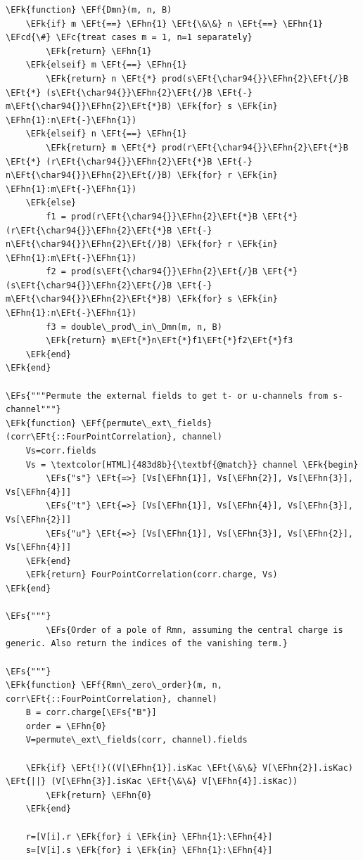 \documentclass[a4paper]{article}
\numberwithin{equation}{section}
\newcommand{\EFc}[1]{\textcolor{EFc}{#1}} %
\newcommand{\EFcd}[1]{\textcolor{EFcd}{#1}} %
\newcommand{\EFs}[1]{\textcolor{EFs}{#1}} %
\newcommand{\EFk}[1]{\textcolor{EFk}{#1}} %
\newcommand{\EFf}[1]{\textcolor{EFf}{#1}} %
\newcommand{\EFt}[1]{\textcolor{EFt}{#1}} %
\newcommand{\EFhn}[1]{\textcolor{EFhn}{#1}} %
\begin{document}
\begin{itemize}
\begin{Code}
\begin{Verbatim}
\EFk{function} \EFf{Dmn}(m, n, B)
    \EFk{if} m \EFt{==} \EFhn{1} \EFt{\&\&} n \EFt{==} \EFhn{1} \EFcd{\#} \EFc{treat cases m = 1, n=1 separately}
        \EFk{return} \EFhn{1}
    \EFk{elseif} m \EFt{==} \EFhn{1}
        \EFk{return} n \EFt{*} prod(s\EFt{\char94{}}\EFhn{2}\EFt{/}B \EFt{*} (s\EFt{\char94{}}\EFhn{2}\EFt{/}B \EFt{-} m\EFt{\char94{}}\EFhn{2}\EFt{*}B) \EFk{for} s \EFk{in} \EFhn{1}:n\EFt{-}\EFhn{1})
    \EFk{elseif} n \EFt{==} \EFhn{1}
        \EFk{return} m \EFt{*} prod(r\EFt{\char94{}}\EFhn{2}\EFt{*}B \EFt{*} (r\EFt{\char94{}}\EFhn{2}\EFt{*}B \EFt{-} n\EFt{\char94{}}\EFhn{2}\EFt{/}B) \EFk{for} r \EFk{in} \EFhn{1}:m\EFt{-}\EFhn{1})
    \EFk{else}
        f1 = prod(r\EFt{\char94{}}\EFhn{2}\EFt{*}B \EFt{*} (r\EFt{\char94{}}\EFhn{2}\EFt{*}B \EFt{-} n\EFt{\char94{}}\EFhn{2}\EFt{/}B) \EFk{for} r \EFk{in} \EFhn{1}:m\EFt{-}\EFhn{1})
        f2 = prod(s\EFt{\char94{}}\EFhn{2}\EFt{/}B \EFt{*} (s\EFt{\char94{}}\EFhn{2}\EFt{/}B \EFt{-} m\EFt{\char94{}}\EFhn{2}\EFt{*}B) \EFk{for} s \EFk{in} \EFhn{1}:n\EFt{-}\EFhn{1})
        f3 = double\_prod\_in\_Dmn(m, n, B)
        \EFk{return} m\EFt{*}n\EFt{*}f1\EFt{*}f2\EFt{*}f3
    \EFk{end}
\EFk{end}

\EFs{"""Permute the external fields to get t- or u-channels from s-channel"""}
\EFk{function} \EFf{permute\_ext\_fields}(corr\EFt{::FourPointCorrelation}, channel)
    Vs=corr.fields
    Vs = \textcolor[HTML]{483d8b}{\textbf{@match}} channel \EFk{begin}
        \EFs{"s"} \EFt{=>} [Vs[\EFhn{1}], Vs[\EFhn{2}], Vs[\EFhn{3}], Vs[\EFhn{4}]]
        \EFs{"t"} \EFt{=>} [Vs[\EFhn{1}], Vs[\EFhn{4}], Vs[\EFhn{3}], Vs[\EFhn{2}]]
        \EFs{"u"} \EFt{=>} [Vs[\EFhn{1}], Vs[\EFhn{3}], Vs[\EFhn{2}], Vs[\EFhn{4}]]
    \EFk{end}
    \EFk{return} FourPointCorrelation(corr.charge, Vs)
\EFk{end}

\EFs{"""}
        \EFs{Order of a pole of Rmn, assuming the central charge is generic. Also return the indices of the vanishing term.}

\EFs{"""}
\EFk{function} \EFf{Rmn\_zero\_order}(m, n, corr\EFt{::FourPointCorrelation}, channel)
    B = corr.charge[\EFs{"B"}]
    order = \EFhn{0}
    V=permute\_ext\_fields(corr, channel).fields

    \EFk{if} \EFt{!}((V[\EFhn{1}].isKac \EFt{\&\&} V[\EFhn{2}].isKac) \EFt{||} (V[\EFhn{3}].isKac \EFt{\&\&} V[\EFhn{4}].isKac))
        \EFk{return} \EFhn{0}
    \EFk{end}

    r=[V[i].r \EFk{for} i \EFk{in} \EFhn{1}:\EFhn{4}]
    s=[V[i].s \EFk{for} i \EFk{in} \EFhn{1}:\EFhn{4}]


\end{Verbatim}
\end{Code}
\end{itemize}
\end{document}
